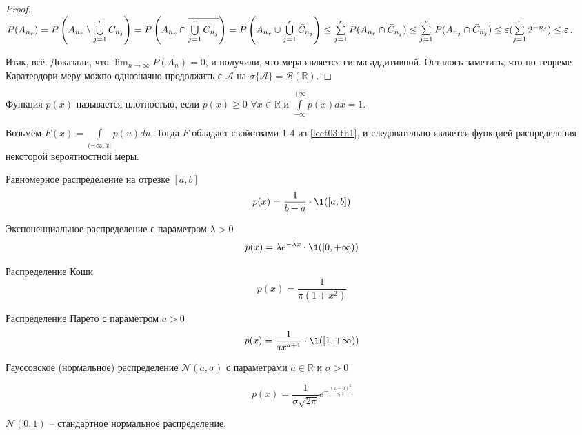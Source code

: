 \begin{proof}
	    $P(A_{n_r}) = P\left(A_{n_r} \setminus \bigcup\limits_{j=1}^{r} C_{n_j}\right) = P\left(A_{n_r}\cap \overline{\bigcup\limits_{j=1}^{r} C_{n_j}} \right) = P\left(A_{n_r}\cup\bigcup\limits_{j=1}^{r}{\bar C_{n_j}} \right) \le \sum\limits_{j=1}^{r} P(A_{n_r} \cap \bar C_{n_j}) \le \sum\limits_{j=1}^{r} P(A_{n_j}\cap \bar C_{n_j}) \le \varepsilon (\sum\limits_{j=1}^{r} 2^{-n_j}) \le \varepsilon$. 
	    
	    Итак, всё. Доказали, что $\lim_{n\to\infty}P(A_n) = 0$, и получили, что мера является сигма-аддитивной. Осталось заметить, что по теореме Каратеодори меру можпо однозначно продолжить с $\mathcal{A}$ на $\sigma \{\mathcal{A}\}=\mathcal{B}(\mathbb{R})$.
	\end{proof}
	
	\begin{definition}\label{lect03:def2}
	    Функция $p(x)$ называется плотностью, если $p(x)\ge 0$ $\forall x\in\mathbb{R}$ и $\int\limits_{-\infty}^{+\infty} p(x)dx = 1$.
	\end{definition}
	
	\begin{prop}\label{lect03:prop1}
	Возьмём $F(x) = \int\limits_{(-\infty,x]}p(u)du$. Тогда $F$ обладает свойствами 1-4 из \ref{lect03:th1}, и следовательно является функцией распределения некоторой вероятностной меры. 
	\end{prop}
	
	\begin{example}
	    Равномерное распределение на отрезке $[a,b]$ $$p(x)=\frac{1}{b-a}\cdot\1([a,b])$$
	\end{example}
	
	\begin{example}
	    Экспоненциальное распределение с параметром $\lambda >0$
	    $$p(x)=\lambda e^{-\lambda x}\cdot\1([0,+\infty))$$
	\end{example}
	
	\begin{example}
	    Распределение Коши
	    $$p(x)=\frac{1}{\pi (1+x^2)}$$
	\end{example}
	
	\begin{example}
	    Распределение Парето с параметром $a>0$
	    $$p(x)=\frac{1}{ax^{a+1}}\cdot\1([1,+\infty))$$
	\end{example}
	
	\begin{example}
	    Гауссовское (нормальное) распределение $\mathcal{N}(a,\sigma)$ с параметрами $a\in\mathbb{R}$ и $\sigma >0$
	    
	    $$p(x) = \frac{1}{\sigma\sqrt{2\pi}}e^{-\frac{(x-a)^2}{2\sigma^2}}$$
	\end{example}
	\begin{definition}
		$\mathcal{N}(0,1)$ -- стандартное нормальное распределение.
	\end{definition}
	
